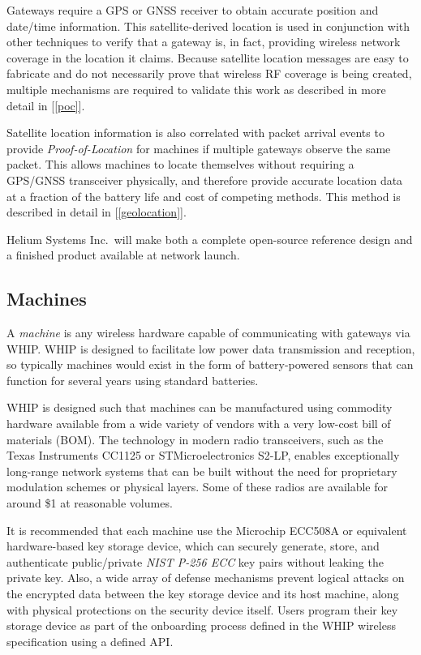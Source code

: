 \documentclass[10pt, nonatbib, nocopyrightspace, reprint]{sigplanconf}
\newcommand{\secref}[1]{[\autoref{#1}]}
\begin{document}
Gateways require a GPS or GNSS receiver to obtain accurate position and date/time information. This satellite-derived location is used in conjunction with other techniques to verify that a gateway is, in fact, providing wireless network coverage in the location it claims. Because satellite location messages are easy to fabricate and do not necessarily prove that wireless RF coverage is being created, multiple mechanisms are required to validate this work as described in more detail in \secref{poc}.

Satellite location information is also correlated with packet arrival events to provide \emph{Proof-of-Location} for machines if multiple gateways observe the same packet. This allows machines to locate themselves without requiring a GPS/GNSS transceiver physically, and therefore provide accurate location data at a fraction of the battery life and cost of competing methods. This method is described in detail in \secref{geolocation}.

Helium Systems Inc.\ will make both a complete open-source reference design and a finished product available at network launch.

\subsection{Machines}\label{machines}

A \emph{machine} is any wireless hardware capable of communicating with gateways via WHIP. WHIP is designed to facilitate low power data transmission and reception, so typically machines would exist in the form of battery-powered sensors that can function for several years using standard batteries.

WHIP is designed such that machines can be manufactured using commodity hardware available from a wide variety of vendors with a very low-cost bill of materials (BOM). The technology in modern radio transceivers, such as the Texas Instruments CC1125 or STMicroelectronics S2-LP, enables exceptionally long-range network systems that can be built without the need for proprietary modulation schemes or physical layers. Some of these radios are available for around \$1 at reasonable volumes.

It is recommended that each machine use the Microchip ECC508A or equivalent hardware-based key storage device, which can securely generate, store, and authenticate public/private \emph{NIST P-256 ECC} \cite{nist} key pairs without leaking the private key. Also, a wide array of defense mechanisms prevent logical attacks on the encrypted data between the key storage device and its host machine, along with physical protections on the security device itself. Users program their key storage device as part of the onboarding process defined in the WHIP wireless specification using a defined API\@.
\end{document}
